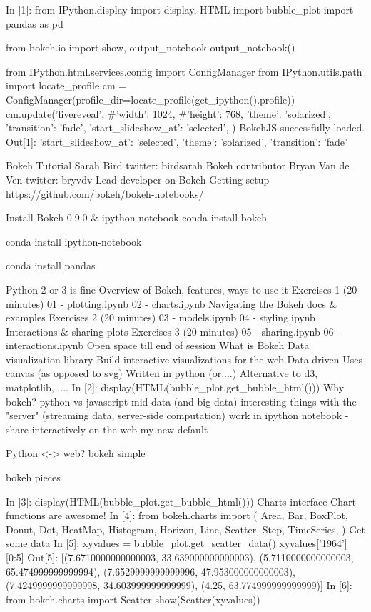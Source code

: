 
In [1]:
from IPython.display import display, HTML
import bubble_plot
import pandas as pd

from bokeh.io import show, output_notebook
output_notebook()

from IPython.html.services.config import ConfigManager
from IPython.utils.path import locate_profile
cm = ConfigManager(profile_dir=locate_profile(get_ipython().profile))
cm.update('livereveal', {
              #'width': 1024,
              #'height': 768,
              'theme': 'solarized',
              'transition': 'fade',
              'start_slideshow_at': 'selected',
})
BokehJS successfully loaded.
Out[1]:
{'start_slideshow_at': 'selected', 'theme': 'solarized', 'transition': 'fade'}
 	
Bokeh Tutorial
Sarah Bird
twitter: birdsarah
Bokeh contributor
Bryan Van de Ven
twitter: bryvdv
Lead developer on Bokeh
Getting setup
https://github.com/bokeh/bokeh-notebooks/

Install Bokeh 0.9.0 & ipython-notebook
conda install bokeh

conda install ipython-notebook

conda install pandas

Python 2 or 3 is fine
Overview of Bokeh, features, ways to use it
Exercises 1 (20 minutes)
01 - plotting.ipynb
02 - charts.ipynb
Navigating the Bokeh docs & examples
Exercises 2 (20 minutes)
03 - models.ipynb
04 - styling.ipynb
Interactions & sharing plots
Exercises 3 (20 minutes)
05 - sharing.ipynb
06 - interactions.ipynb
Open space till end of session
What is Bokeh
Data visualization library
Build interactive visualizations for the web
Data-driven
Uses canvas (as opposed to svg)
Written in python (or....)
Alternative to d3, matplotlib, ....
In [2]:
display(HTML(bubble_plot.get_bubble_html()))
Why bokeh?
python vs javascript
mid-data (and big-data)
interesting things with the "server" (streaming data, server-side computation)
work in ipython notebook - share interactively on the web
my new default

Python <-> web?
bokeh simple

bokeh pieces

In [3]:
display(HTML(bubble_plot.get_bubble_html()))
Charts interface
Chart functions are awesome!
In [4]:
from bokeh.charts import (
Area, Bar, BoxPlot, Donut, Dot, HeatMap, Histogram,
Horizon, Line, Scatter, Step, TimeSeries, 
)
Get some data
In [5]:
xyvalues = bubble_plot.get_scatter_data()
xyvalues['1964'][0:5]
Out[5]:
[(7.6710000000000003, 33.639000000000003),
 (5.7110000000000003, 65.474999999999994),
 (7.6529999999999996, 47.953000000000003),
 (7.4249999999999998, 34.603999999999999),
 (4.25, 63.774999999999999)]
In [6]:
from bokeh.charts import Scatter
show(Scatter(xyvalues))
	
